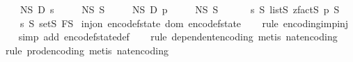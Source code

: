 \begin{isabellebody}
\ \ \ \ N\isactrlsub S\ {\isasymtimes}\isactrlsub D\ {\isacharparenleft}{\kern0pt}{\isasymlambda}s{\isachardot}{\kern0pt}\ \isanewline
\ \ \ \ N\isactrlsub S\ {\isasymtimes}\isactrlsub S\ {\isacharparenleft}{\kern0pt}\isanewline
\ \ \ \ N\isactrlsub S\ {\isasymtimes}\isactrlsub D\ {\isacharparenleft}{\kern0pt}{\isasymlambda}p{\isachardot}{\kern0pt}\ \isanewline
\ \ \ \ N\isactrlsub S\ {\isasymtimes}\isactrlsub S\ {\isacharparenleft}{\kern0pt}\ \isanewline
\ \ \ \ {\isacharparenleft}{\kern0pt}{\isacharbrackleft}{\kern0pt}{}{\isachardot}{\kern0pt}{\isachardot}{\kern0pt}{\isacharless}{\kern0pt}s{\isacharbrackright}{\kern0pt}\ {\isasymrightarrow}\isactrlsub S\ {\isacharparenleft}{\kern0pt}list\isactrlsub S\ {\isacharparenleft}{\kern0pt}zfact\isactrlsub S\ p{\isacharparenright}{\kern0pt}{\isacharparenright}{\kern0pt}{\isacharparenright}{\kern0pt}\ {\isasymtimes}\isactrlsub S\isanewline
\ \ \ \ {\isacharparenleft}{\kern0pt}{\isacharbrackleft}{\kern0pt}{}{\isachardot}{\kern0pt}{\isachardot}{\kern0pt}{\isacharless}{\kern0pt}s{\isacharbrackright}{\kern0pt}\ {\isasymrightarrow}\isactrlsub S\ {\isacharparenleft}{\kern0pt}set\isactrlsub S\ F\isactrlsub S{\isacharparenright}{\kern0pt}{\isacharparenright}{\kern0pt}{\isacharparenright}{\kern0pt}{\isacharparenright}{\kern0pt}{\isacharparenright}{\kern0pt}{\isacharparenright}{\kern0pt}{\isachardoublequoteclose}\isanewline
\isanewline
{}\isamarkupfalse%
\ {\isachardoublequoteopen}inj{\isacharunderscore}{\kern0pt}on\ encode{\isacharunderscore}{\kern0pt}f{}{\isacharunderscore}{\kern0pt}state\ {\isacharparenleft}{\kern0pt}dom\ encode{\isacharunderscore}{\kern0pt}f{}{\isacharunderscore}{\kern0pt}state{\isacharparenright}{\kern0pt}{\isachardoublequoteclose}\isanewline
%
\isadelimproof
\ \ %
\endisadelimproof
%
\isatagproof
{}\isamarkupfalse%
\ {\isacharparenleft}{\kern0pt}rule\ encoding{\isacharunderscore}{\kern0pt}imp{\isacharunderscore}{\kern0pt}inj{\isacharparenright}{\kern0pt}\isanewline
\ \ \isamarkupfalse%
\ {\isacharparenleft}{\kern0pt}simp\ add{\isacharcolon}{\kern0pt}\ encode{\isacharunderscore}{\kern0pt}f{}{\isacharunderscore}{\kern0pt}state{\isacharunderscore}{\kern0pt}def{\isacharparenright}{\kern0pt}\isanewline
\ \ \isamarkupfalse%
\ {\isacharparenleft}{\kern0pt}rule\ dependent{\isacharunderscore}{\kern0pt}encoding{\isacharcomma}{\kern0pt}\ metis\ nat{\isacharunderscore}{\kern0pt}encoding{\isacharparenright}{\kern0pt}\isanewline
\ \ \isamarkupfalse%
\ {\isacharparenleft}{\kern0pt}rule\ prod{\isacharunderscore}{\kern0pt}encoding{\isacharcomma}{\kern0pt}\ metis\ nat{\isacharunderscore}{\kern0pt}encoding{\isacharparenright}{\kern0pt}\isanewline

\end{isabellebody}
